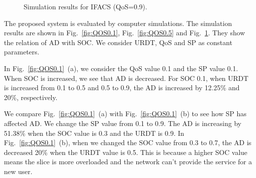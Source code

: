 \documentclass[graybox]{svmult}
\begin{document}
\begin{figure}\centering
	\caption{\label{fig:QOS0.9}Simulation results for IFACS (QoS=0.9).}
\end{figure}

The proposed system is evaluated by computer simulations. The simulation results are shown in Fig.~\ref{fig:QOS0.1}, Fig.~\ref{fig:QOS0.5} and Fig.~\ref{fig:QOS0.9}. They show the relation of AD with SOC. We consider URDT, QoS and SP as constant parameters. 

In Fig.~\ref{fig:QOS0.1}~(a), we consider the QoS value 0.1 and the SP value 0.1. When SOC is increased, we see that AD is decreased. For SOC 0.1, when URDT is increased from 0.1 to 0.5 and 0.5 to 0.9, the AD is increased by 12.25\% and 20\%, respectively. 

We compare Fig.~\ref{fig:QOS0.1}~(a) with Fig.~\ref{fig:QOS0.1}~(b) to see how SP has affected AD. We change the SP value from 0.1 to 0.9. The AD is increasing by 51.38\% when the SOC value is 0.3 and the URDT is 0.9. In Fig.~\ref{fig:QOS0.1}~(b), when we changed the SOC value from 0.3 to 0.7, the AD is decreased 20\% when the URDT value is 0.5. This is because a higher SOC value means the slice is more overloaded and the network can't provide the service for a new user.
\end{document}

